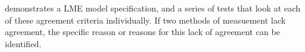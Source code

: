 \documentclass[12pt, a4paper]{report}
\theoremstyle{plain}
\theoremstyle{definition}
\theoremstyle{remark}
\begin{document}
\citet{ARoy2009} demonstrates a LME model specification, and a series of tests that look at each of these agreement criteria individually. If two methods of measuement lack agreement, the specific reason or reasons for this lack of agreement can be identified.



\end{document}
